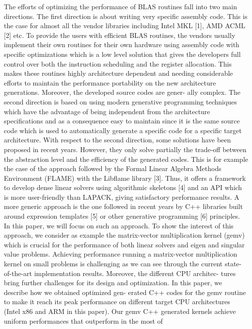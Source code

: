 \documentclass[../../main.tex]{subfiles}
\begin{document}
The efforts of optimizing the performance of BLAS routines
fall into two main directions. The first direction is about
writing very specific assembly code. This is the case for
almost all the vendor libraries including Intel MKL [1], AMD
ACML [2] etc. To provide the users with efficient BLAS
routines, the vendors usually implement their own routines
for their own hardware using assembly code with specific
optimizations which is a low level solution that gives the
developers full control over both the instruction scheduling
and the register allocation. This makes these routines highly
architecture dependent and needing considerable efforts to
maintain the performance portability on the new architecture
generations. Moreover, the developed source codes are gener-
ally complex. The second direction is based on using modern
generative programming techniques which have the advantage
of being independent from the architecture specifications and
as a consequence easy to maintain since it is the same source
code which is used to automatically generate a specific code
for a specific target architecture. With respect to the second
direction, some solutions have been proposed in recent years.
However, they only solve partially the trade-off between the
abstraction level and the efficiency of the generated codes.
This is for example the case of the approach followed by
the Formal Linear Algebra Methods Environment (FLAME)
with the Libflame library [3]. Thus, it offers a framework to
develop dense linear solvers using algorithmic skeletons [4]
and an API which is more user-friendly than LAPACK, giving
satisfactory performance results. A more generic approach is
the one followed in recent years by C++ libraries built around
expression templates [5] or other generative programming [6]
principles. In this paper, we will focus on such an approach.
To show the interest of this approach, we consider as
example the matrix-vector multiplication kernel (gemv) which
is crucial for the performance of both linear solvers and eigen
and singular value problems. Achieving performance running
a matrix-vector multiplication kernel on small problems is
challenging as we can see through the current state-of-the-art
implementation results. Moreover, the different CPU architec-
tures bring further challenges for its design and optimization.
In this paper, we describe how we obtained optimized gen-
erated C++ codes for the gemv routine to make it reach its
peak performance on different target CPU architectures (Intel
x86 and ARM in this paper). Our gemv C++ generated kernels
achieve uniform performances that outperform in the most of
\end{document}
